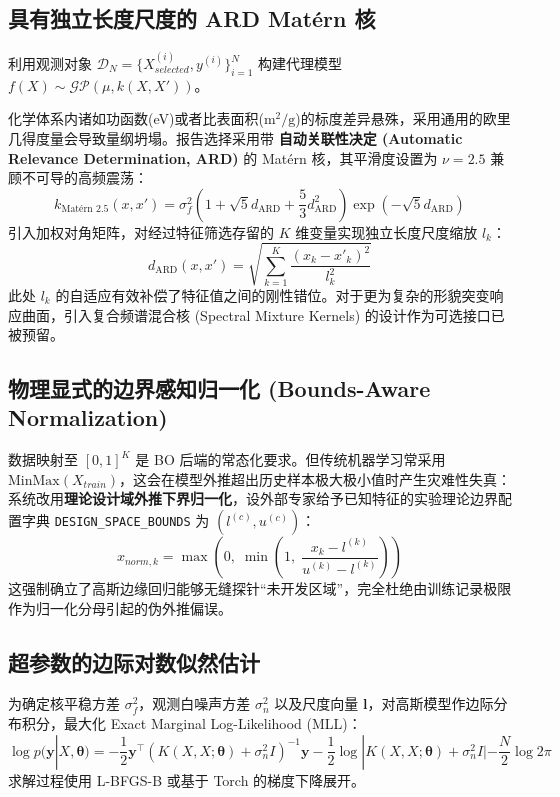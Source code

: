 \documentclass[12pt,a4paper]{article}
\begin{document}
\subsection{具有独立长度尺度的 ARD Matérn 核}
利用观测对象 $\mathcal{D}_N = \{X_{selected}^{(i)}, y^{(i)}\}_{i=1}^N$ 构建代理模型 $f(X) \sim \mathcal{GP}(\mu, k(X, X'))$。

化学体系内诸如功函数(eV)或者比表面积($\text{m}^2/\text{g}$)的标度差异悬殊，采用通用的欧里几得度量会导致量纲坍塌。报告选择采用带 \textbf{自动关联性决定 (Automatic Relevance Determination, ARD)} 的 Matérn 核，其平滑度设置为 $\nu = 2.5$ 兼顾不可导的高频震荡：
\begin{equation}
    k_{\text{Matérn } 2.5}(x, x') = \sigma_f^2 \left( 1 + \sqrt{5} d_{\text{ARD}} + \frac{5}{3} d_{\text{ARD}}^2 \right) \exp\left( -\sqrt{5} d_{\text{ARD}} \right)
\end{equation}
引入加权对角矩阵，对经过特征筛选存留的 $K$ 维变量实现独立长度尺度缩放 $l_k$：
\begin{equation}
    d_{\text{ARD}}(x, x') = \sqrt{ \sum_{k=1}^K \frac{(x_k - x'_k)^2}{l_k^2} }
\end{equation}
此处 $l_k$ 的自适应有效补偿了特征值之间的刚性错位。对于更为复杂的形貌突变响应曲面，引入复合频谱混合核 (Spectral Mixture Kernels)\cite{catbox2025} 的设计作为可选接口已被预留。

\subsection{物理显式的边界感知归一化 (Bounds-Aware Normalization)}
数据映射至 $[0,1]^K$ 是 BO 后端的常态化要求。但传统机器学习常采用 $\text{MinMax}(X_{train})$，这会在模型外推超出历史样本极大极小值时产生灾难性失真：
系统改用\textbf{理论设计域外推下界归一化}，设外部专家给予已知特征的实验理论边界配置字典 \texttt{DESIGN\_SPACE\_BOUNDS} 为 $(l^{(c)}, u^{(c)})$：
\begin{equation}
    x_{norm, k} = \max \left( 0, \;\min \left( 1, \; \frac{x_k - l^{(k)}}{u^{(k)} - l^{(k)}} \right) \right)
\end{equation}
这强制确立了高斯边缘回归能够无缝探针“未开发区域”，完全杜绝由训练记录极限作为归一化分母引起的伪外推偏误。

\subsection{超参数的边际对数似然估计}
为确定核平稳方差 $\sigma_f^2$，观测白噪声方差 $\sigma_n^2$ 以及尺度向量 $\mathbf{l}$，对高斯模型作边际分布积分，最大化 Exact Marginal Log-Likelihood (MLL)：
\begin{equation}
    \log p(\mathbf{y} | X, \bm{\theta}) = -\frac{1}{2} \mathbf{y}^\top (K(X, X; \bm{\theta}) + \sigma_n^2 I)^{-1} \mathbf{y} - \frac{1}{2} \log|K(X, X; \bm{\theta}) + \sigma_n^2 I| - \frac{N}{2} \log 2\pi
\end{equation}
求解过程使用 L-BFGS-B 或基于 Torch 的梯度下降展开。
\end{document}
